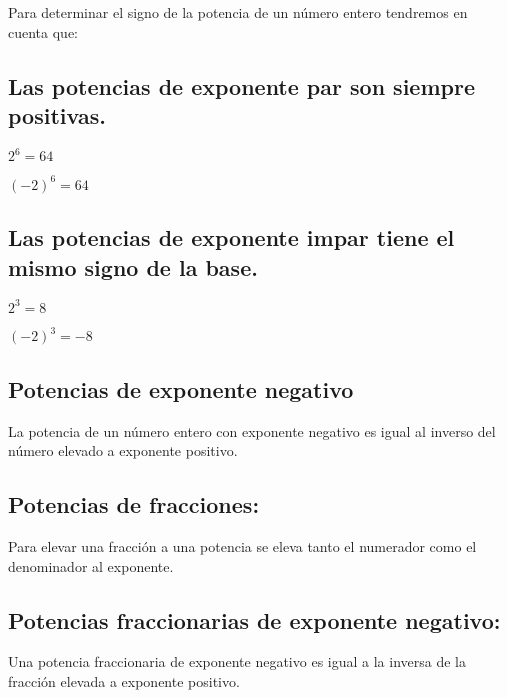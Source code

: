 \documentclass{article}
\begin{document}
Para determinar el signo de la potencia de un n\'umero entero tendremos en cuenta que:

\subsection[Las potencias de exponente par son siempre positivas. \ ]{Las potencias de exponente par son siempre positivas. \ }

\bigskip

 $2^{6}=64$

 ${(-2)}^{6}=64$

\subsection[Las potencias de exponente impar tiene el mismo signo de la base. \ ]{Las potencias de exponente impar tiene el mismo signo de la base. \ }

\bigskip

 $2^{3}=8$

 ${(-2)}^{3}=-8$


\bigskip

\subsection[Potencias de exponente negativo]{Potencias de exponente negativo}

\bigskip

La potencia de un n\'umero entero con exponente negativo es igual al inverso del n\'umero elevado a exponente positivo. \ \ \ \ 

\subsection[Potencias de fracciones:]{Potencias de fracciones:}

\bigskip

Para elevar una fracci\'on a una potencia se eleva tanto el numerador como el denominador al exponente. \ \ 

\subsection[Potencias fraccionarias de exponente negativo:]{Potencias fraccionarias de exponente negativo:}

\bigskip

Una potencia fraccionaria de exponente negativo es igual a la inversa de la fracci\'on elevada a exponente positivo. \ \ \ \ \ \ 
\end{document}
